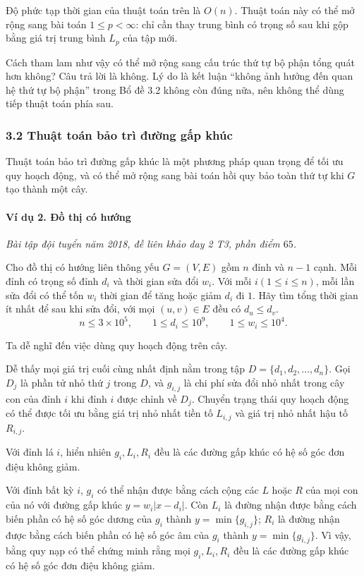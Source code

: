 \documentclass[11pt]{article}
\begin{document}
Độ phức tạp thời gian của thuật toán trên là \(O(n)\). Thuật toán này có thể mở
rộng sang bài toán \(1\le p<\infty\): chỉ cần thay trung bình có trọng số sau
khi gộp bằng giá trị trung bình \(L_p\) của tập mới.

Cách tham lam như vậy có thể mở rộng sang cấu trúc thứ tự bộ phận tổng quát hơn
không? Câu trả lời là không. Lý do là kết luận ``không ảnh hưởng đến quan hệ
thứ tự bộ phận'' trong Bổ đề 3.2 không còn đúng nữa, nên không thể dùng tiếp
thuật toán phía sau.

\subsubsection*{3.2 Thuật toán bảo trì đường gấp khúc}

Thuật toán bảo trì đường gấp khúc là một phương pháp quan trọng để tối ưu quy
hoạch động, và có thể mở rộng sang bài toán hồi quy bảo toàn thứ tự khi \(G\)
tạo thành một cây.

\paragraph{Ví dụ 2. Đồ thị có hướng}
\noindent\emph{Bài tập đội tuyển năm 2018, đề liên khảo day 2 T3, phần điểm
\(65\).}

Cho đồ thị có hướng liên thông yếu \(G=(V,E)\) gồm \(n\) đỉnh và \(n-1\) cạnh.
Mỗi đỉnh có trọng số đỉnh \(d_i\) và thời gian sửa đổi \(w_i\). Với mỗi
\(i(1\le i\le n)\), mỗi lần sửa đổi có thể tốn \(w_i\) thời gian để tăng hoặc
giảm \(d_i\) đi \(1\). Hãy tìm tổng thời gian ít nhất để sau khi sửa đổi, với
mọi \((u,v)\in E\) đều có \(d_u\le d_v\).
\[
  n\le 3\times 10^5,\qquad 1\le d_i\le 10^9,\qquad 1\le w_i\le 10^4.
\]

Ta dễ nghĩ đến việc dùng quy hoạch động trên cây.

Dễ thấy mọi giá trị cuối cùng nhất định nằm trong tập
\(D=\{d_1,d_2,\ldots,d_n\}\). Gọi \(D_j\) là phần tử nhỏ thứ \(j\) trong \(D\),
và \(g_{i,j}\) là chi phí sửa đổi nhỏ nhất trong cây con của đỉnh \(i\) khi
đỉnh \(i\) được chỉnh về \(D_j\). Chuyển trạng thái quy hoạch động có thể được
tối ưu bằng giá trị nhỏ nhất tiền tố \(L_{i,j}\) và giá trị nhỏ nhất hậu tố
\(R_{i,j}\).

Với đỉnh lá \(i\), hiển nhiên \(g_i,L_i,R_i\) đều là các đường gấp khúc có hệ số
góc đơn điệu không giảm.

Với đỉnh bất kỳ \(i\), \(g_i\) có thể nhận được bằng cách cộng các \(L\) hoặc
\(R\) của mọi con của nó với đường gấp khúc \(y=w_i|x-d_i|\). Còn \(L_i\) là
đường nhận được bằng cách biến phần có hệ số góc dương của \(g_i\) thành
\(y=\min\{g_{i,j}\}\); \(R_i\) là đường nhận được bằng cách biến phần có hệ số
góc âm của \(g_i\) thành \(y=\min\{g_{i,j}\}\). Vì vậy, bằng quy nạp có thể chứng
minh rằng mọi \(g_i,L_i,R_i\) đều là các đường gấp khúc có hệ số góc đơn điệu
không giảm.
\end{document}
